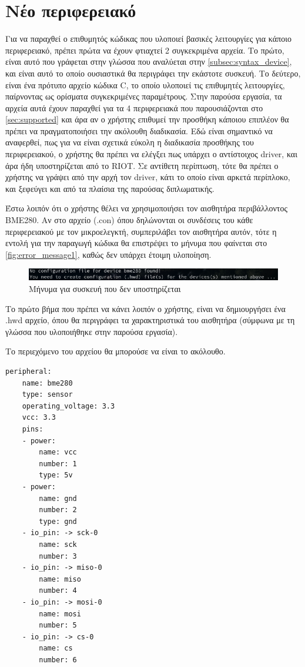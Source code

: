 \section{Νέο περιφερειακό}
\label{sec:example2}

Για να παραχθεί ο επιθυμητός κώδικας που υλοποιεί βασικές λειτουργίες για κάποιο περιφερειακό, πρέπει πρώτα να έχουν φτιαχτεί 2 συγκεκριμένα αρχεία. Το πρώτο, είναι αυτό που γράφεται στην γλώσσα που αναλύεται στην \autoref{subsec:syntax_device}, και είναι αυτό το οποίο ουσιαστικά θα περιγράφει την εκάστοτε συσκευή. Το δεύτερο, είναι ένα πρότυπο αρχείο κώδικα C, το οποίο υλοποιεί τις επιθυμητές λειτουργίες, παίρνοντας ως ορίσματα συγκεκριμένες παραμέτρους. Στην παρούσα εργασία, τα αρχεία αυτά έχουν παραχθεί για τα 4 περιφερειακά που παρουσιάζονται στο \autoref{sec:supported} και άρα αν ο χρήστης επιθυμεί την προσθήκη κάποιου επιπλέον θα πρέπει να πραγματοποιήσει την ακόλουθη διαδικασία. Εδώ είναι σημαντικό να αναφερθεί, πως για να είναι σχετικά εύκολη η διαδικασία προσθήκης του περιφερειακού, ο χρήστης θα πρέπει να ελέγξει πως υπάρχει ο αντίστοιχος driver, και άρα ήδη υποστηρίζεται από το RIOT. Σε αντίθετη περίπτωση, τότε θα πρέπει ο χρήστης να γράψει από την αρχή τον driver, κάτι το οποίο είναι αρκετά περίπλοκο, και ξεφεύγει και από τα πλαίσια της παρούσας διπλωματικής.

Έστω λοιπόν ότι ο χρήστης θέλει να χρησιμοποιήσει τον αισθητήρα περιβάλλοντος BME280. Αν στο αρχείο (.con) όπου δηλώνονται οι συνδέσεις του κάθε περιφερειακού με τον μικροελεγκτή, συμπεριλάβει τον αισθητήρα αυτόν, τότε η εντολή για την παραγωγή κώδικα θα επιστρέψει το μήνυμα που φαίνεται στο \autoref{fig:error_message1}, καθώς δεν υπάρχει έτοιμη υλοποίηση.

\begin{figure}[!ht]
	\centering
	\includegraphics[width=1.0\textwidth]{./images/chapter6/error_message1.png}
	\caption{Μήνυμα για συσκευή που δεν υποστηρίζεται}
	\label{fig:error_message1}
\end{figure}

Το πρώτο βήμα που πρέπει να κάνει λοιπόν ο χρήστης, είναι να δημιουργήσει ένα .hwd αρχείο, όπου θα περιγράφει τα χαρακτηριστικά του αισθητήρα (σύμφωνα με τη γλώσσα που υλοποιήθηκε στην παρούσα εργασία).

Το περιεχόμενο του αρχείου θα μπορούσε να είναι το ακόλουθο.

\begin{lstlisting}
peripheral:
	name: bme280
	type: sensor
	operating_voltage: 3.3
	vcc: 3.3
	pins:
	- power:
		name: vcc
		number: 1
		type: 5v
	- power:
		name: gnd
		number: 2
		type: gnd
	- io_pin: -> sck-0
		name: sck
		number: 3
	- io_pin: -> miso-0
		name: miso
		number: 4
	- io_pin: -> mosi-0
		name: mosi
		number: 5
	- io_pin: -> cs-0
		name: cs
		number: 6
\end{lstlisting}

